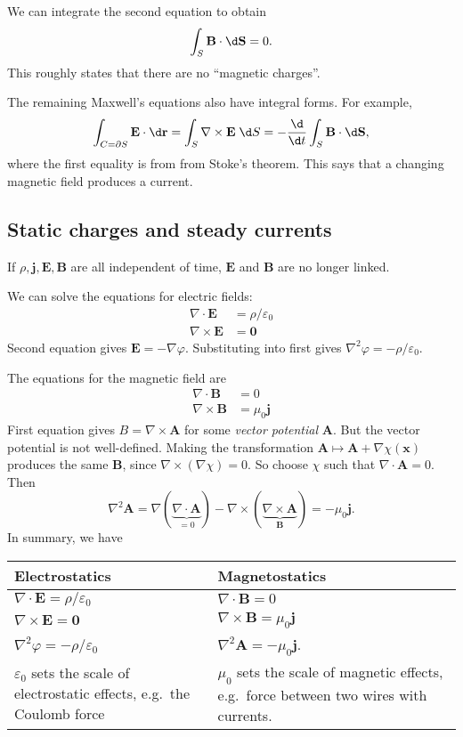 \documentclass[a4paper]{article}
\begin{document}
We can integrate the second equation to obtain
\[
  \int_S \mathbf{B}\cdot \d \mathbf{S} = 0.
\]
This roughly states that there are no ``magnetic charges''.

The remaining Maxwell's equations also have integral forms. For example,
\[
  \int_{C = \partial S} \mathbf{E}\cdot \d \mathbf{r} = \int_S \nabla \times \mathbf{E}\;\d S = -\frac{\d }{\d t}\int_S \mathbf{B}\cdot \d \mathbf{S},
\]
where the first equality is from from Stoke's theorem. This says that a changing magnetic field produces a current.

\subsection{Static charges and steady currents}
If $\rho, \mathbf{j}, \mathbf{E}, \mathbf{B}$ are all independent of time, $\mathbf{E}$ and $\mathbf{B}$ are no longer linked.

We can solve the equations for electric fields:
\begin{align*}
  \nabla\cdot \mathbf{E} &= \rho/\varepsilon_0\\
  \nabla\times \mathbf{E} &= \mathbf{0}
\end{align*}
Second equation gives $\mathbf{E} = -\nabla \varphi$. Substituting into first gives $\nabla^2 \varphi = -\rho/\varepsilon_0$.

The equations for the magnetic field are
\begin{align*}
  \nabla\cdot \mathbf{B} &= 0\\
  \nabla\times \mathbf{B} &= \mu_0 \mathbf{j}
\end{align*}
First equation gives $B = \nabla \times \mathbf{A}$ for some \emph{vector potential} $\mathbf{A}$. But the vector potential is not well-defined. Making the transformation $\mathbf{A}\mapsto \mathbf{A} + \nabla \chi(\mathbf{x})$ produces the same $\mathbf{B}$, since $\nabla\times (\nabla \chi) = 0$. So choose $\chi$ such that $\nabla\cdot \mathbf{A} = 0$. Then
\[
  \nabla^2 \mathbf{A} = \nabla(\underbrace{\nabla\cdot \mathbf{A}}_{=0}) - \nabla\times (\underbrace{\nabla\times \mathbf{A}}_{\mathbf{B}}) = -\mu_0 \mathbf{j}.
\]
In summary, we have
\begin{center}
  \begin{tabularx}{\textwidth}{XX}
    \toprule
    Electrostatics & Magnetostatics\\
    \midrule
    $\nabla\cdot \mathbf{E} = \rho/\varepsilon_0$ & $\nabla\cdot \mathbf{B} = 0$\\
    $\nabla\times \mathbf{E} = \mathbf{0}$ & $\nabla\times \mathbf{B} = \mu_0 \mathbf{j}$\\
    $\nabla^2 \varphi = -\rho/\varepsilon_0$ & $\nabla^2 \mathbf{A} = -\mu_0 \mathbf{j}$.\\
    $\varepsilon_0$ sets the scale of electrostatic effects, e.g.\ the Coulomb force & $\mu_0$ sets the scale of magnetic effects, e.g.\ force between two wires with currents.\\
    \bottomrule
  \end{tabularx}
\end{center}
\end{document}
